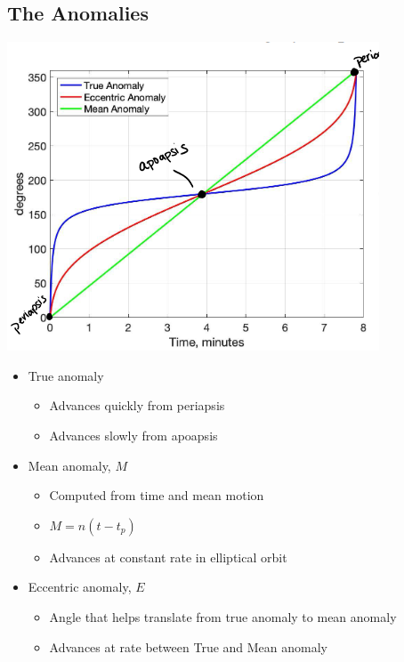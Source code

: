 \documentclass{article}
\begin{document}
\begin{multicols*}{3}
    \subsection*{The Anomalies}
    \includegraphics[width=\linewidth]{Figures/The_Anomalies.png}
    \begin{itemize}
        \item True anomaly
        \begin{itemize}
            \item Advances quickly from periapsis
            \item Advances slowly from apoapsis
        \end{itemize}
        \item Mean anomaly, $M$
        \begin{itemize}
            \item Computed from time and mean motion
            \item $M = n(t-t_p)$
            \item Advances at constant rate in elliptical orbit
        \end{itemize}
        \item Eccentric anomaly, $E$
        \begin{itemize}
            \item Angle that helps translate from true anomaly to mean anomaly
            \item Advances at rate between True and Mean anomaly 
        \end{itemize}
    \end{itemize}


\end{multicols*}
\end{document}
